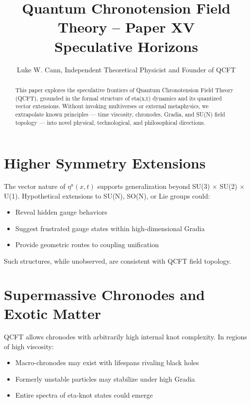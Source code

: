 \documentclass[12pt]{article}
\title{Quantum Chronotension Field Theory – Paper XV\\Speculative Horizons}
\author{Luke W. Cann, Independent Theoretical Physicist and Founder of QCFT}
\date{}
\begin{document}
\maketitle

\begin{abstract}
This paper explores the speculative frontiers of Quantum Chronotension Field Theory (QCFT), grounded in the formal structure of eta(x,t) dynamics and its quantized vector extensions. Without invoking multiverses or external metaphysics, we extrapolate known principles — time viscosity, chronodes, Gradia, and SU(N) field topology — into novel physical, technological, and philosophical directions.
\end{abstract}

\section{Higher Symmetry Extensions}

The vector nature of $\eta^a(x,t)$ supports generalization beyond SU(3) $\times$ SU(2) $\times$ U(1). Hypothetical extensions to SU(N), SO(N), or Lie groups could:

\begin{itemize}
\item Reveal hidden gauge behaviors
\item Suggest frustrated gauge states within high-dimensional Gradia
\item Provide geometric routes to coupling unification
\end{itemize}

Such structures, while unobserved, are consistent with QCFT field topology.

\section{Supermassive Chronodes and Exotic Matter}

QCFT allows chronodes with arbitrarily high internal knot complexity. In regions of high viscosity:

\begin{itemize}
\item Macro-chronodes may exist with lifespans rivaling black holes
\item Formerly unstable particles may stabilize under high Gradia
\item Entire spectra of eta-knot states could emerge
\end{itemize}
\end{document}
